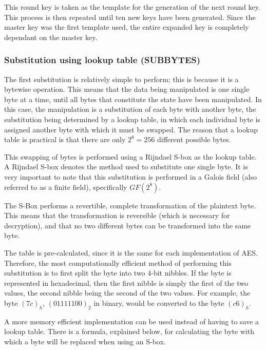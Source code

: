\documentclass[12pt, a4paper]{report}
\theoremstyle{definition}
\theoremstyle{remark}
\begin{document}
This round key is taken as the template for the generation of the next round key. This process is then repeated until ten new keys have been generated. Since the master key was the first template used, the entire expanded key is completely dependant on the master key.

\subsubsection{Substitution using lookup table (SUBBYTES)}
\label{SubBytes}
The first substitution is relatively simple to perform; this is because it is a bytewise operation. This means that the data being manipulated is one single byte at a time, until all bytes that constitute the state have been manipulated. In this case, the manipulation is a substitution of each byte with another byte, the substitution being determined by a lookup table, in which each individual byte is assigned another byte with which it must be swapped. The reason that a lookup table is practical is that there are only $2^8 = 256$ different possible bytes.

This swapping of bytes is performed using a Rijndael S-box as the lookup table. A Rijndael S-box denotes the method used to substitute one single byte. It is very important to note that this substitution is performed in a Galois field (also referred to as a finite field)\cite{GaloisField}, specifically $GF(2^8)$.

The S-Box performs a revertible, complete transformation of the plaintext byte\cite{SBox}. This means that the transformation is reversible (which is necessary for decryption), and that no two different bytes can be transformed into the same byte.

The table is pre-calculated, since it is the same for each implementation of AES. Therefore, the most computationally efficient method of performing this substitution is to first split the byte into two 4-bit nibbles. If the byte is represented in hexadecimal, then the first nibble is simply the first of the two values, the second nibble being the second of the two values. For example, the byte $(7c)_h$, $(01111100)_2$ in binary, would be converted to the byte $(c6)_h$.


A more memory efficient implementation can be used instead of having to save a lookup table. There is a formula, explained below, for calculating the byte with which a byte will be replaced when using an S-box. 
\end{document}
